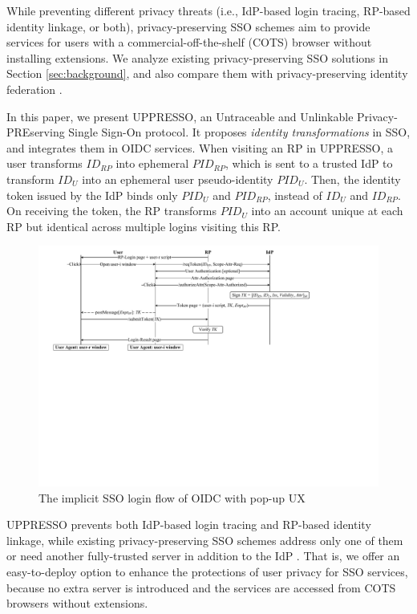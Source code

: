 While preventing different privacy threats (i.e., IdP-based login tracing, RP-based identity linkage, or both),
privacy-preserving SSO schemes \cite{maler2008venn, NIST2017draft, BrowserID, save-flow, SPRESSO,miso,POIDC} aim to provide services for users with a commercial-off-the-shelf (COTS) browser without installing extensions.
We analyze existing privacy-preserving SSO solutions in Section \ref{sec:background},
    and also compare them with privacy-preserving identity federation \cite{PseudoID, ELPASSO, UnlimitID, Opaak, uprov, hyperledge-idemix}.

In this paper, we present UPPRESSO, an Untraceable and Unlinkable Privacy-PREserving Single Sign-On protocol.
It proposes {\em identity transformations} in SSO,
 and integrates them in OIDC services.
When visiting an RP in UPPRESSO, a user transforms $ID_{RP}$ into ephemeral $PID_{RP}$, which is sent to a trusted IdP to transform $ID_U$ into an ephemeral user pseudo-identity $PID_U$.
Then, the identity token issued by the IdP binds only $PID_U$ and $PID_{RP}$, instead of $ID_U$ and $ID_{RP}$. On receiving the token, %
 the RP transforms $PID_U$ into an account unique at each RP but identical across multiple logins visiting this RP.


\begin{figure}[tb]
  \centering
  \includegraphics[width=0.81\linewidth]{fig/OIDC-pop.pdf}
  \caption{The implicit SSO login flow of OIDC with pop-up UX}
  \label{fig:OpenID}
\end{figure}

UPPRESSO prevents both IdP-based login tracing and RP-based identity linkage, while existing privacy-preserving SSO schemes address only one of them \cite{BrowserID, SPRESSO, NIST2017draft, save-flow,POIDC} or need another fully-trusted server in addition to the IdP \cite{miso,SPRESSO}.
That is, we offer an easy-to-deploy option to enhance the protections of user privacy for SSO services, because no extra server is introduced and the services are accessed from COTS browsers without extensions.

